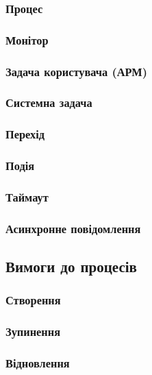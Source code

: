 \subsubsection{Процес}

\subsubsection{Монітор}

\subsubsection{Задача користувача (АРМ)}

\subsubsection{Системна задача}

\subsubsection{Перехід}

\subsubsection{Подія}

\subsubsection{Таймаут}

\subsubsection{Асинхронне повідомлення}

\subsection{Вимоги до процесів}

\subsubsection{Створення}

\subsubsection{Зупинення}

\subsubsection{Відновлення}

